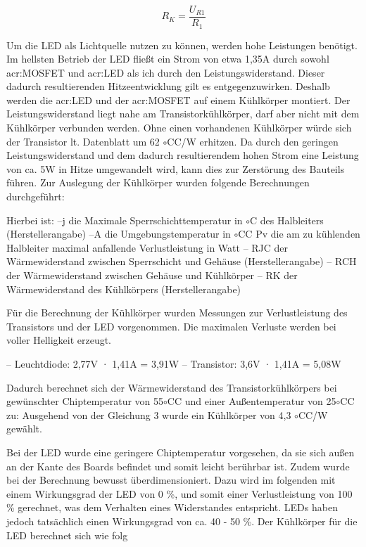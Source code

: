 \begin{equation}
	\label{equ:thermo}
	R_{K} = \frac{U_{R1}}{R_{1}}
\end{equation}



Um die LED als Lichtquelle nutzen zu können, werden hohe Leistungen benötigt.
Im hellsten Betrieb der LED fließt ein Strom von etwa 1,35A durch sowohl \gls{acr:MOSFET} und \gls{acr:LED} als ich durch den Leistungswiderstand. Dieser dadurch resultierenden Hitzeentwicklung gilt es entgegenzuwirken. Deshalb werden die \gls{acr:LED} und der \gls{acr:MOSFET} auf einem Kühlkörper montiert. Der Leistungswiderstand liegt nahe am Transistorkühlkörper, darf aber nicht mit dem Kühlkörper verbunden werden.
Ohne einen vorhandenen Kühlkörper würde sich der Transistor lt. Datenblatt um
62 $\circ$CC/W erhitzen. Da durch den geringen Leistungswiderstand und dem dadurch
resultierendem hohen Strom eine Leistung von ca. 5W in Hitze umgewandelt wird,
kann dies zur Zerstörung des Bauteils führen.
Zur Auslegung der Kühlkörper wurden folgende Berechnungen durchgeführt:

Hierbei ist:
–j die Maximale Sperrschichttemperatur in $\circ$C des Halbleiters (Herstellerangabe)
–A die Umgebungstemperatur in $\circ$CC
Pv die am zu kühlenden Halbleiter maximal anfallende Verlustleistung in
Watt
– RJC der Wärmewiderstand zwischen Sperrschicht und Gehäuse (Herstellerangabe)
– RCH der Wärmewiderstand zwischen Gehäuse und Kühlkörper
– RK der Wärmewiderstand des Kühlkörpers (Herstellerangabe)

Für die Berechnung der Kühlkörper wurden Messungen zur Verlustleistung des
Transistors und der LED vorgenommen. Die maximalen Verluste werden bei voller
Helligkeit erzeugt.

– Leuchtdiode: 2,77V · 1,41A = 3,91W
– Transistor: 3,6V · 1,41A = 5,08W

Dadurch berechnet sich der Wärmewiderstand des Transistorkühlkörpers bei gewünschter
Chiptemperatur von 55$\circ$CC und einer Außentemperatur von 25$\circ$CC zu:
Ausgehend von der Gleichung 3 wurde ein Kühlkörper von 4,3 $\circ$CC/W gewählt.

Bei der LED wurde eine geringere Chiptemperatur vorgesehen, da sie sich außen
an der Kante des Boards befindet und somit leicht berührbar ist. Zudem wurde
bei der Berechnung bewusst überdimensioniert. Dazu wird im folgenden mit einem
Wirkungsgrad der LED von 0 \%, und somit einer Verlustleistung von 100  \%
gerechnet, was dem Verhalten eines Widerstandes entspricht. LEDs haben jedoch
tatsächlich einen Wirkungsgrad von ca. 40 - 50 \%.
Der Kühlkörper für die LED berechnet sich wie folg

